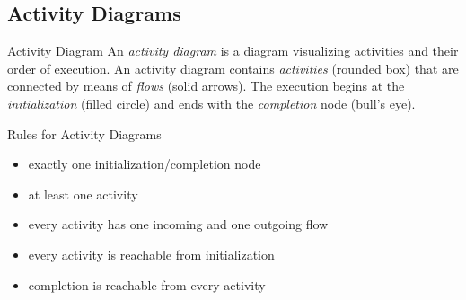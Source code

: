 
\subsection{Activity Diagrams}
\begin{frame}{\insertsubsection}
	\begin{fancycolumns}[animation=none]
		\nextcolumn
		\begin{definition}{Activity Diagram }
			An \emph{activity diagram} is a diagram visualizing activities and their order of execution. An activity diagram contains \emph{activities} (rounded box) that are connected by means of \emph{flows} (solid arrows). The execution begins at the \emph{initialization} (filled circle) and ends with the \emph{completion} node (bull's eye). 
		\end{definition}
		\pause%
		\begin{note}{Rules for Activity Diagrams}
			\begin{itemize}
				\item exactly one initialization/completion node
				\item at least one activity
				\item every activity has one incoming and one outgoing flow
				\item every activity is reachable from initialization
				\item completion is reachable from every activity
			\end{itemize}
		\end{note}
	\end{fancycolumns}
\end{frame}


